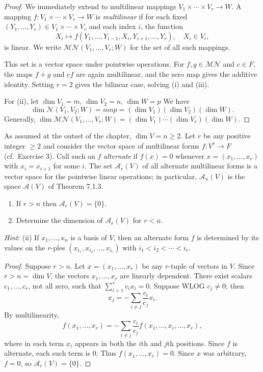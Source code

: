 \begin{proof}
    We immediately extend to multilinear mappings $V_1 \times \cdots \times V_r \longrightarrow W$.
    A mapping $f : V_1 \times \cdots \times V_r \longrightarrow W$ is \textit{multilinear} if for each
    fixed $(Y_1, \ldots, Y_r) \in V_1 \times \cdots \times V_r$ and each index $i$, the function
    \[X_i \mapsto f(Y_1, \ldots, Y_{i-1}, X_i, Y_{i+1}, \ldots, Y_r), \quad X_i \in V_i,\]
    is linear. We write $\mathcal{MN}(V_1, \ldots, V_r; W)$ for the set of all such mappings.

    This set is a vector space under pointwise operations. 
    For $f, g \in \mathcal{MN}$ and $c \in F$,
    the maps $f + g$ and $c f$ are again multilinear,
    and the zero map gives the additive identity. Setting $r = 2$ gives the bilinear case,
    solving (i) and (iii).

    For (ii), let $\dim V_1 = m$, $\dim V_2 = n$, $\dim W = p$ We have
    \[\dim \mathcal{N}(V_1, V_2; W) = mnp = (\dim V_1)(\dim V_2)(\dim W).\]
    Generally, $\dim \mathcal{MN}(V_1, \ldots, V_r; W) = (\dim V_1) \cdots (\dim V_r)(\dim W)$.
\end{proof}


\begin{tcolorbox}[title=Problem 4, breakable]
    As assumed at the outset of the chapter, $\dim V = n \geq 2$. Let $r$ be any positive integer
    $\geq 2$ and consider the vector space of multilinear forms $f : V^r \longrightarrow F$
    (cf.\ Exercise 3). Call such an $f$ \textit{alternate} if $f(x) = 0$ whenever
    $x = (x_1, \ldots, x_r)$ with $x_i = x_{i+1}$ for some $i$. The set $\mathcal{A}_r(V)$ of all
    alternate multilinear forms is a vector space for the pointwise linear operations; in particular,
    $\mathcal{A}_n(V)$ is the space $\mathcal{A}(V)$ of Theorem 7.1.3.
    \begin{enumerate}
        \item[(i)] If $r > n$ then $\mathcal{A}_r(V) = \{0\}$.
        \item[(ii)] Determine the dimension of $\mathcal{A}_r(V)$ for $r < n$.
    \end{enumerate}
    \textit{Hint}: (ii) If $x_1, \ldots, x_n$ is a basis of $V$, then an alternate form $f$ is
    determined by its values on the $r$-ples $(x_{i_1}, x_{i_2}, \ldots, x_{i_r})$ with
    $i_1 < i_2 < \cdots < i_r$.
\end{tcolorbox}

\begin{proof}
    Suppose $r > n$.
    Let $x = (x_1, \ldots, x_r)$ be any $r$-tuple of vectors in $V$.
    Since $r > n = \dim V$, the vectors $x_1, \ldots, x_r$ are linearly dependent.
    There exist scalars $c_1, \ldots, c_r$, not all zero, such that
    $\sum_{i=1}^r c_i x_i = 0$. Suppose WLOG $c_j \ne 0$; then
    \[x_j = -\sum_{i \ne j} \frac{c_i}{c_j} x_i.\]
    By multilinearity,
    \[
    f(x_1, \ldots, x_r)
    =
    -\sum_{i \ne j} \frac{c_i}{c_j}
    f(x_1, \ldots, x_i, \ldots, x_r),
    \]
    where in each term $x_i$ appears in both the $i$th and $j$th positions.
    Since $f$ is alternate, each such term is $0$. Thus $f(x_1, \ldots, x_r) = 0$.
    Since $x$ was arbitrary, $f = 0$, so $\mathcal{A}_r(V) = \{0\}$.
\end{proof}

